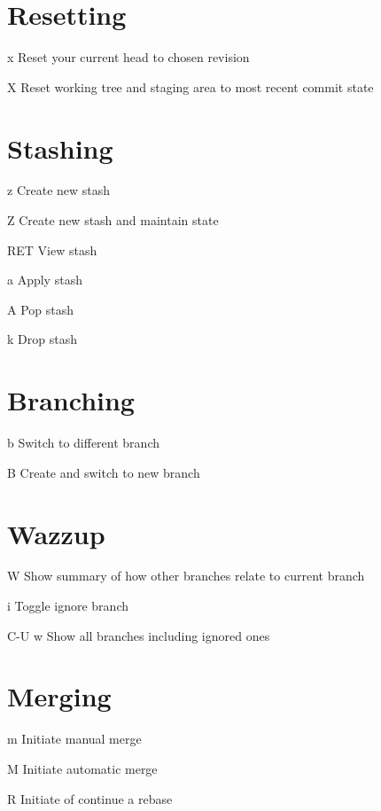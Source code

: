 \documentclass[9pt,a4paper,landscape]{extarticle}
\begin{document}
\begin{multicols}{3}
\section{Resetting}
\begin{eqlist}
\item[x] Reset your current head to chosen revision
\item[X] Reset working tree and staging area to most recent commit state
\end{eqlist}

\section{Stashing}
\begin{eqlist}
\item[z] Create new stash
\item[Z] Create new stash and maintain state
\item[RET] View stash
\item[a] Apply stash
\item[A] Pop stash
\item[k] Drop stash
\end{eqlist}

\section{Branching}
\begin{eqlist}
\item[b] Switch to different branch
\item[B] Create and switch to new branch
\end{eqlist}

\section{Wazzup}
\begin{eqlist}
\item[W] Show summary of how other branches relate to current branch
\item[i] Toggle ignore branch
\item[C-U w] Show all branches including ignored ones
\end{eqlist}

\section{Merging}
\begin{eqlist}
\item[m] Initiate manual merge
\item[M] Initiate automatic merge
\item[R] Initiate of continue a rebase
\end{eqlist}


\end{multicols}
\end{document}

